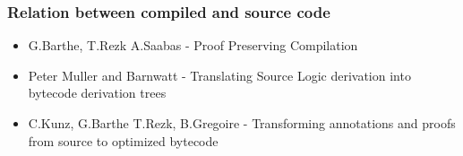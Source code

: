 \documentclass{beamer}
\begin{document}
\begin{frame}\frametitle{ Relation between compiled and source code}
\begin{itemize}
   \item G.Barthe, T.Rezk A.Saabas - Proof Preserving Compilation 

 \item Peter Muller and Barnwatt - Translating Source Logic derivation  into bytecode derivation trees 


\item  C.Kunz, G.Barthe T.Rezk, B.Gregoire - Transforming annotations and proofs from source to optimized bytecode

 \end{itemize}

\end{frame}
\end{document}
